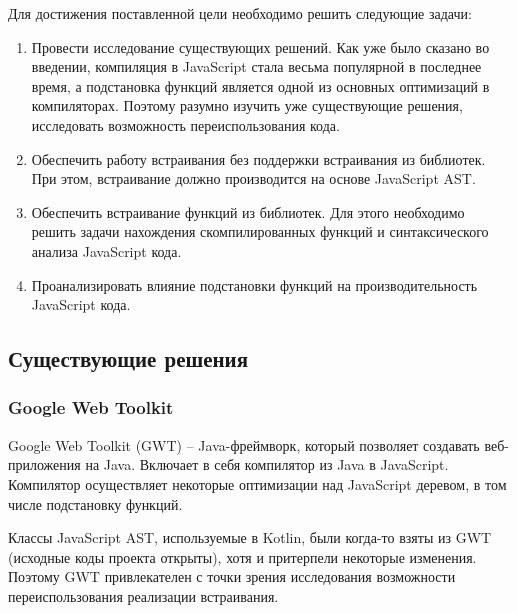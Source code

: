 Для достижения поставленной цели необходимо решить
следующие задачи:
\begin{enumerate}
  \item Провести исследование существующих решений.
  Как уже было сказано во введении,
  компиляция в JavaScript стала весьма популярной
  в последнее время, а подстановка функций
  является одной из основных оптимизаций в компиляторах.
  Поэтому разумно изучить уже существующие решения,
  исследовать возможность переиспользования кода.
  \item Обеспечить работу встраивания без поддержки
  встраивания из библиотек. При этом,
  встраивание должно производится на основе JavaScript AST.
  \item Обеспечить встраивание функций из библиотек. Для этого
  необходимо решить задачи нахождения скомпилированных
  функций и синтаксического анализа JavaScript кода.
  \item Проанализировать влияние подстановки функций
  на производительность JavaScript кода.
\end{enumerate}

\subsection{Существующие решения}

\subsubsection{Google Web Toolkit}

Google Web Toolkit (GWT) -- Java-фреймворк, который позволяет
создавать веб-приложения на Java. Включает в себя компилятор
из Java в JavaScript. Компилятор осуществляет некоторые
оптимизации над JavaScript деревом, в том числе подстановку
функций.

Классы JavaScript AST, используемые в Kotlin, были когда-то
взяты из GWT (исходные коды проекта открыты), хотя
и притерпели некоторые изменения. Поэтому
GWT привлекателен с точки зрения исследования
возможности переиспользования реализации встраивания.

